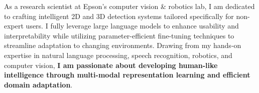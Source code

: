 \documentclass[10pt, letterpaper]{awesome-cv} %
\begin{document}
\makecvheader %

\begin{cvletter}
\vspace*{-0.05cm}
As a research scientist at Epson's computer vision \& robotics lab, I am dedicated to crafting intelligent 2D and 3D detection systems tailored specifically for non-expert users. I fully leverage large language models to enhance usability and interpretability while utilizing parameter-efficient fine-tuning techniques to streamline adaptation to changing environments. Drawing from my hands-on expertise in natural language processing, speech recognition, robotics, and computer vision, \textbf{I am passionate about developing human-like intelligence through multi-modal representation learning and efficient domain adaptation}.
\end{cvletter}








%
%
%

\end{document}
